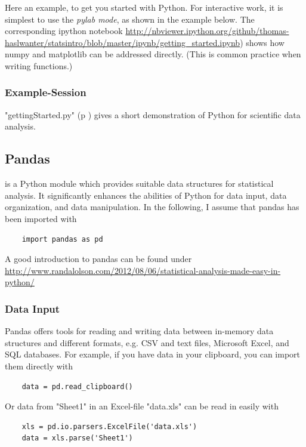 Here an example, to get you started with Python. For interactive work, it is
simplest to use the \emph{pylab mode}, as shown in the example below. The corresponding ipython
notebook
 \url{http://nbviewer.ipython.org/github/thomas-haslwanter/statsintro/blob/master/ipynb/getting\_started.ipynb})
shows how numpy and matplotlib can be addressed directly. (This is common
practice when writing functions.)

\subsubsection{Example-Session}

\PyImg "gettingStarted.py" (p \pageref{py:gettingStarted_ipy}) gives a short demonstration of Python for scientific data analysis.


\subsection{Pandas}

\cite{pandas} is a Python module which provides suitable data structures for
statistical analysis. It significantly enhances the abilities of Python for
data input, data organization, and data manipulation. In the following, I assume
that pandas has been imported with

\begin{lstlisting}
    import pandas as pd
\end{lstlisting}

A good introduction to pandas can be found under
\url{http://www.randalolson.com/2012/08/06/statistical-analysis-made-easy-in-python/}

\subsubsection{Data Input}

Pandas offers tools for reading and writing data between in-memory data structures and different
formats, e.g. CSV and text files, Microsoft Excel, and SQL databases. For example, if you have data
in your clipboard, you can import them directly with

\begin{lstlisting}
    data = pd.read_clipboard()
\end{lstlisting}

Or data from "Sheet1" in an Excel-file "data.xls" can be read in easily with

\begin{lstlisting}
    xls = pd.io.parsers.ExcelFile('data.xls')
    data = xls.parse('Sheet1')
\end{lstlisting}

